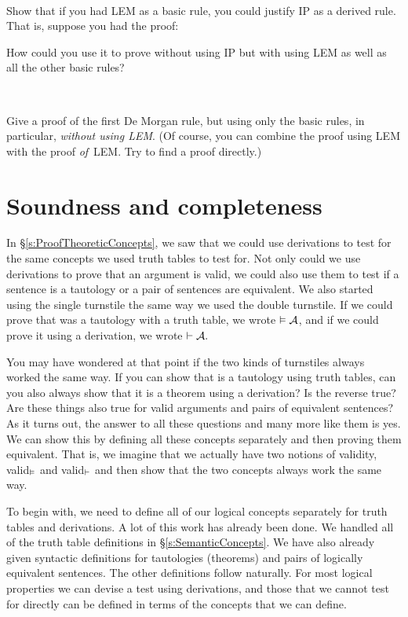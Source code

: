 \

\problempart
Show that if you had LEM as a basic rule, you could justify IP as a derived rule. That is, suppose you had the proof:
\begin{fitchproof}
  \open
  \close
\end{fitchproof}
How could you use it to prove  without using IP but with using LEM as well as all the other basic rules?

\

\problempart
Give a proof of the first De Morgan rule, but using only the basic rules, in particular, \emph{without using LEM}. (Of course, you can combine the proof using LEM with the proof \emph{of}~LEM. Try to find a proof directly.)

\chapter{Soundness and completeness}
\label{sec:soundness_and_completeness}

In \S\ref{s:ProofTheoreticConcepts}, we saw that we could use derivations to test for the same concepts we used truth tables to test for. Not only could we use derivations to prove that an argument is valid, we could also use them to test if a sentence is a tautology or a pair of sentences are equivalent. We also started using the single turnstile the same way we used the double turnstile. If we could prove that  was a tautology with a truth table, we wrote $\vDash \mathcal{A}$, and if we could prove it using a derivation, we wrote $\vdash \mathcal{A}.$ 

You may have wondered at that point if the two kinds of turnstiles always worked the same way. If you can show that  is a tautology using truth tables, can you also always show that it is a theorem using a derivation? Is the reverse true? Are these things also true for valid arguments and pairs of equivalent sentences? As it turns out, the answer to all these questions and many more like them is yes. We can show this by defining all these concepts separately and then proving them equivalent. That is, we imagine that we actually have two notions of validity, valid$_{\vDash}$ and  valid$_{\vdash}$ and then show that the two concepts always work the same way. 

To begin with, we need to define all of our logical concepts separately for truth tables and derivations. A lot of this work has already been done. We handled all of the truth table definitions in \S\ref{s:SemanticConcepts}. We have also already given syntactic definitions for tautologies (theorems) and pairs of logically equivalent sentences. The other definitions follow naturally. For most logical properties we can devise a test using derivations, and those that we cannot test for directly can be defined in terms of the concepts that we can define.

